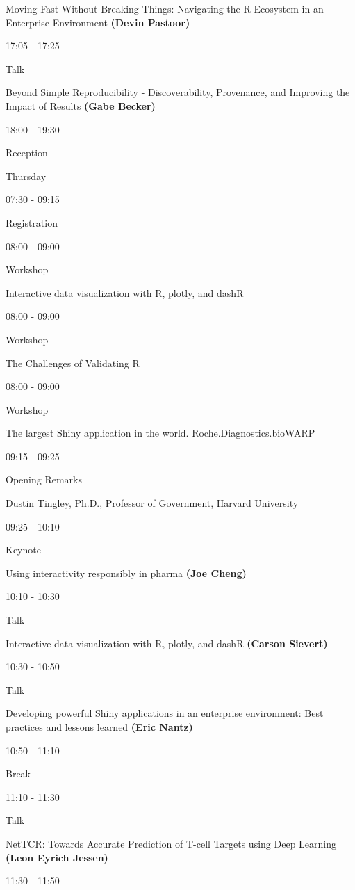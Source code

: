 \documentclass[]{book}
\theoremstyle{definition}
\theoremstyle{definition}
\theoremstyle{definition}
\theoremstyle{remark}
\begin{document}
Moving Fast Without Breaking Things: Navigating the R Ecosystem in an
Enterprise Environment \textbf{(Devin Pastoor)}

17:05 - 17:25

Talk

Beyond Simple Reproducibility - Discoverability, Provenance, and
Improving the Impact of Results \textbf{(Gabe Becker)}

18:00 - 19:30

Reception

Thursday

07:30 - 09:15

Registration

08:00 - 09:00

Workshop

Interactive data visualization with R, plotly, and dashR

08:00 - 09:00

Workshop

The Challenges of Validating R

08:00 - 09:00

Workshop

The largest Shiny application in the world. Roche.Diagnostics.bioWARP

09:15 - 09:25

Opening Remarks

Dustin Tingley, Ph.D., Professor of Government, Harvard University

09:25 - 10:10

Keynote

Using interactivity responsibly in pharma \textbf{(Joe Cheng)}

10:10 - 10:30

Talk

Interactive data visualization with R, plotly, and dashR \textbf{(Carson
Sievert)}

10:30 - 10:50

Talk

Developing powerful Shiny applications in an enterprise environment:
Best practices and lessons learned \textbf{(Eric Nantz)}

10:50 - 11:10

Break

11:10 - 11:30

Talk

NetTCR: Towards Accurate Prediction of T-cell Targets using Deep
Learning \textbf{(Leon Eyrich Jessen)}

11:30 - 11:50
\end{document}
